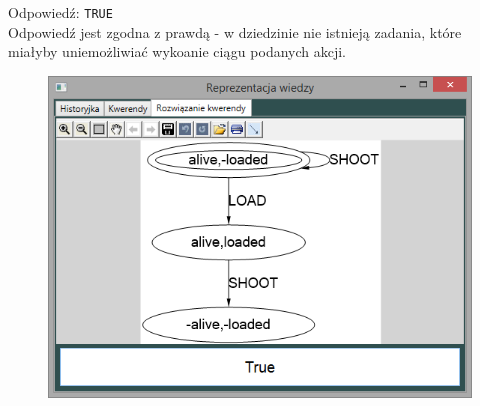 \documentclass{article}
\begin{document}
\begin{itemize}
    Odpowiedź: \texttt{TRUE}\\
    Odpowiedź jest zgodna z prawdą - w dziedzinie nie istnieją zadania, które miałyby uniemożliwiać wykoanie ciągu podanych akcji.
    \begin{figure}[H]
    \centering
    \includegraphics[scale=0.5]{test1_4}
    \end{figure}
\end{itemize}

\newpage
\end{document}
